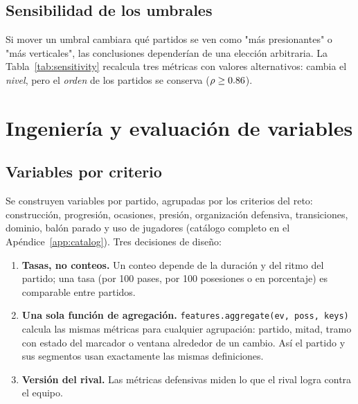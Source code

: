 \documentclass[11pt,a4paper]{article}
\begin{document}
\subsection{Sensibilidad de los umbrales}
Si mover un umbral cambiara qué partidos se ven como "más presionantes" o "más verticales", las conclusiones dependerían
de una elección arbitraria. La Tabla~\ref{tab:sensitivity} recalcula tres métricas con valores alternativos:
cambia el \emph{nivel}, pero el \emph{orden} de los partidos se conserva ($\rho\geq0.86$).



\section{Ingeniería y evaluación de variables}\label{sec:variables}
\subsection{Variables por criterio}
Se construyen \nVariables{} variables por partido, agrupadas por los criterios del reto: construcción, progresión,
ocasiones, presión, organización defensiva, transiciones, dominio, balón parado y uso de jugadores (catálogo completo en
el Apéndice~\ref{app:catalog}). Tres decisiones de diseño:
\begin{enumerate}
  \item \textbf{Tasas, no conteos.} Un conteo depende de la duración y del ritmo del partido; una tasa (por 100 pases,
        por 100 posesiones o en porcentaje) es comparable entre partidos.
  \item \textbf{Una sola función de agregación.} \texttt{features.aggregate(ev, poss, keys)} calcula las mismas métricas
        para cualquier agrupación: partido, mitad, tramo con estado del marcador o ventana alrededor de un cambio. Así
        el partido y sus segmentos usan exactamente las mismas definiciones.
  \item \textbf{Versión del rival.} Las métricas defensivas miden lo que el rival logra contra el equipo.
\end{enumerate}
\end{document}
